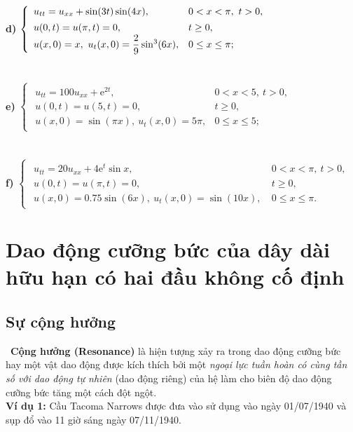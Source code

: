 \documentclass[10pt, a4paper]{article}
\begin{document}
	\textbf{d) } $\begin{cases}
		\begin{array}{ll}
			u_{tt}=u_{xx}+\sin(3t)\sin(4x), & 0<x<\pi,~t>0,\\
			\noalign{\vskip2pt}
			u(0,t)=u(\pi,t)=0, & t\ge0,\\
			u(x,0)=x,~u_t(x,0)=\dfrac29\sin^3(6x), & 0\le x\le\pi;
		\end{array}
	\end{cases}$\\\\\\
	\textbf{e) } $\begin{cases}
		\begin{array}{ll}
			u_{tt}=100u_{xx}+\mathrm e^{2t}, & 0<x<5,~t>0,\\
			u(0,t)=u(5,t)=0, & t\ge0,\\
			u(x,0)=\sin(\pi x),~u_t(x,0)=5\pi, & 0\le x\le5;
		\end{array}
	\end{cases}$\\\\\\
	\textbf{f) } $\begin{cases}
		\begin{array}{ll}
			u_{tt}=20u_{xx}+4\mathrm e^t\sin x, & 0<x<\pi,~t>0,\\
			u(0,t)=u(\pi,t)=0, & t\ge0,\\
			u(x,0)=0.75\sin(6x),~u_t(x,0)=\sin(10x),~ & 0\le x\le\pi.
		\end{array}
	\end{cases}$
	\newpage
	\section{Dao động cưỡng bức của dây dài hữu hạn có hai đầu không cố định}
	\subsection{Sự cộng hưởng}
	\vspace{2mm}
	\quad\,\,\,\textbf{\color{red}Cộng hưởng (Resonance)} là hiện tượng xảy ra trong dao động cưỡng bức hay một vật dao động được kích thích bởi một \textit{ngoại lực tuần hoàn có cùng tần số với dao động tự nhiên} (dao động riêng) của hệ làm cho biên độ dao động cưỡng bức tăng một cách đột ngột.\\
	
	\textbf{Ví dụ 1:} Cầu Tacoma Narrows được đưa vào sử dụng vào ngày 01/07/1940 và sụp đổ vào 11 giờ sáng ngày 07/11/1940.
	
\end{document}

